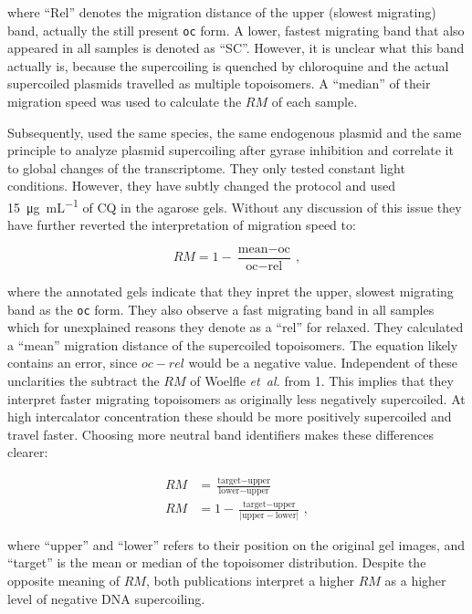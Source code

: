 \documentclass[10pt,a4]{article}
\newcommand{\ugml}{\micro\gram\per\milli\liter}
\newcommand{\etal}{\textit{et~al.}}
\begin{document}
where ``Rel'' denotes the migration distance of the upper (slowest
migrating) band, actually the still present \texttt{oc} form.
A lower, fastest migrating band that also appeared in all samples
is denoted as ``SC''. However, it is unclear what this band actually
is, because the supercoiling is quenched by chloroquine and the actual
supercoiled plasmids travelled as multiple topoisomers. A ``median'' of
their migration speed was used to calculate the $RM$ of each sample.

Subsequently, \citet{Vijayan2009} used the same species,
the same endogenous plasmid and the same principle to analyze plasmid
supercoiling after gyrase inhibition and correlate it to global
changes of the transcriptome. They only tested constant light
conditions.  However, they have subtly changed the protocol and used
\SI{15}{\ugml} of CQ in the agarose gels. Without any discussion of
this issue they have further reverted the interpretation of migration
speed to:

\begin{equation}
  RM = 1 - \frac{\text{mean} - \text{oc}}{\text{oc} - \text{rel}}\,,
\end{equation}

where the annotated gels indicate that they inpret the upper, slowest
migrating band as the \texttt{oc} form. They also observe a fast
migrating band in all samples which for unexplained reasons they
denote as a ``rel'' for relaxed. They calculated a ``mean'' migration
distance of the supercoiled topoisomers. The equation likely contains
an error, since $oc-rel$ would be a negative value. Independent of
these unclarities the subtract the $RM$ of Woelfle \etal{} from
1. This implies that they interpret faster migrating topoisomers
as originally less negatively supercoiled. At high intercalator
concentration these should be more positively supercoiled and travel
faster.
%
Choosing more neutral band identifiers makes these
differences clearer:

\begin{align}
  RM &= \frac{\text{target} - \text{upper}}{\text{lower} - \text{upper}}\\
  RM &=1-\frac{\text{target} - \text{upper}}{\lvert \text{upper} - \text{lower} \rvert}\,,
\end{align}

where ``upper'' and ``lower'' refers to their position on the original
gel images, and ``target'' is the mean or median of the topoisomer
distribution.  Despite the opposite meaning of $RM$, both publications
interpret a higher $RM$ as a higher level of negative DNA
supercoiling.
 
\end{document}
